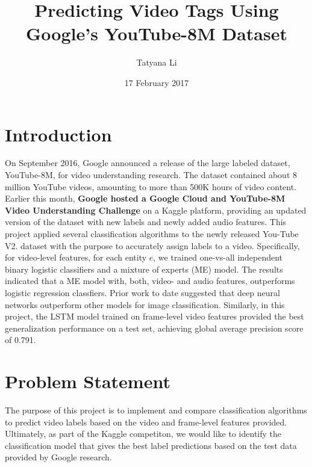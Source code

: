 \documentclass{sig-alternate-05-2015}
\begin{document}

\title{Predicting Video Tags Using Google's YouTube-8M Dataset}

\author{
Tatyana Li \\
}
\date{17 February 2017}

\maketitle

\section{Introduction}
On September 2016, Google announced a release of the large labeled dataset, YouTube-8M, for video understanding research. The dataset contained about 8 million YouTube videos, amounting to more than 500K hours of video content. Earlier this month, \textbf{Google hosted a Google Cloud and YouTube-8M Video Understanding Challenge} on a Kaggle platform, providing an updated version of the dataset with new labels and newly added audio features. This project applied several classification algorithms to the newly released You-Tube V2. dataset with the purpose to accurately assign labels to a video. 
Specifically, for video-level features, for each entity $e$, we trained one-vs-all independent binary logistic classifiers and a mixture of experts (ME) model. The results indicated that a ME model with, both, video- and audio features, outperforms logistic regression classfiers. Prior work to date suggested that deep neural networks outperform other models for image classification. Similarly, in this project, the LSTM model trained on frame-level video features provided the best generalization performance on a test set, achieving global average precision score of 0.791.


\section{Problem Statement}
The purpose of this project is to implement and compare classification algorithms to predict video labels based on the video and frame-level features provided. Ultimately, as part of the Kaggle competiton, we would like to identify the classification model that gives the best label predictions based on the test data provided by Google research. 
\end{document}

